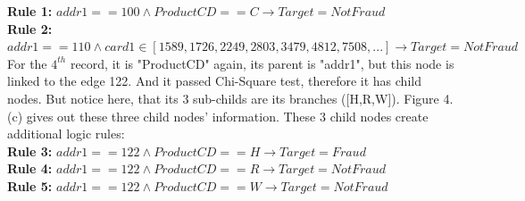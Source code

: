 \documentclass{article}
\begin{document}
\textbf{Rule 1:} $addr1 == 100 \land ProductCD == C \rightarrow Target =NotFraud$\\
\textbf{Rule 2:} $addr1 == 110 \land card1 \in [1589,1726,2249,2803,3479,4812,7508,...] \rightarrow Target = NotFraud$\\
For the $4^{th}$ record, it is "ProductCD" again, its parent is "addr1", but this node is linked to the edge 122. And it passed Chi-Square test, therefore it has child nodes. But notice here, that its 3 sub-childs are its branches ([H,R,W]). Figure 4.(c) gives out these three child nodes' information. These 3 child nodes create additional logic rules:\\ 
\textbf{Rule 3:} $addr1 == 122 \land ProductCD == H \rightarrow Target =Fraud$\\
\textbf{Rule 4:} $addr1 == 122 \land ProductCD == R \rightarrow Target = NotFraud$\\
\textbf{Rule 5:} $addr1 == 122 \land ProductCD == W \rightarrow Target = NotFraud$\\\\
\end{document}
